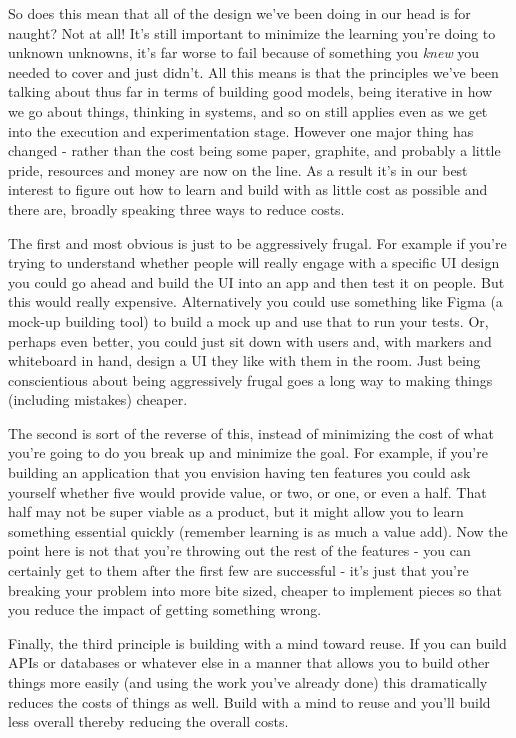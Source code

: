 \documentclass[11pt,a5paper]{book}
\begin{document}
So does this mean that all of the design we've been doing in our head is for naught? Not at all! It's still important to minimize the learning you're doing to unknown unknowns, it's far worse to fail because of something you \textit{knew} you needed to cover and just didn't. All this means is that the principles we've been talking about thus far in terms of building good models, being iterative in how we go about things, thinking in systems, and so on still applies even as we get into the execution and experimentation stage. However one major thing has changed - rather than the cost being some paper, graphite, and probably a little pride, resources and money are now on the line. As a result it's in our best interest to figure out how to learn and build with as little cost as possible and there are, broadly speaking \cite{macmillan} \cite{patton} three ways to reduce costs. 
\newline

The first and most obvious is just to be aggressively frugal. For example if you're trying to understand whether people will really engage with a specific UI design you could go ahead and build the UI into an app and then test it on people. But this would really expensive. Alternatively you could use something like Figma (a mock-up building tool) to build a mock up and use that to run your tests. Or, perhaps even better, you could just sit down with users and, with markers and whiteboard in hand, design a UI they like with them in the room. Just being conscientious about being aggressively frugal goes a long way to making things (including mistakes) cheaper.
\newline

The second is sort of the reverse of this, instead of minimizing the cost of what you're going to do you break up and minimize the goal. For example, if you're building an application that you envision having ten features you could ask yourself whether five would provide value, or two, or one, or even a half. That half may not be super viable as a product, but it might allow you to learn something essential quickly (remember learning is as much a value add). Now the point here is not that you're throwing out the rest of the features - you can certainly get to them after the first few are successful - it's just that you're breaking your problem into more bite sized, cheaper to implement pieces so that you reduce the impact of getting something wrong. 
\newline

Finally, the third principle is building with a mind toward reuse. If you can build APIs or databases or whatever else in a manner that allows you to build other things more easily (and using the work you've already done) this dramatically reduces the costs of things as well. Build with a mind to reuse and you'll build less overall thereby reducing the overall costs.
\newline
\end{document}
